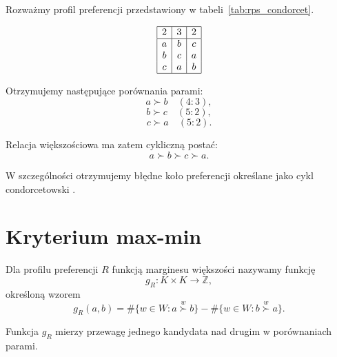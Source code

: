 \documentclass[12pt,a4paper]{mwrep}
\begin{document}
	\begin{example}
		Rozważmy profil preferencji przedstawiony w tabeli~\ref{tab:rps_condorcet}.
		
		\begin{table}[H]
			\centering
			\[
			\begin{array}{|c|c|c|}
				\hline
				2 & 3 & 2\\
				\hline
				a & b & c\\
				b & c & a\\
				c & a & b\\
				\hline
			\end{array}
			\]
			\caption{Profil preferencji typu kamień–papier–nożyce}
			\label{tab:rps_condorcet}
		\end{table}
		
		Otrzymujemy następujące porównania parami:
		\[
		a \succ b \quad (4:3),
		\]
		\[
		b \succ c \quad (5:2),
		\]
		\[
		c \succ a \quad (5:2).
		\]
		
		Relacja większościowa ma zatem cykliczną postać:
		\[
		a \succ b \succ c \succ a.
		\]
		
		W szczególności otrzymujemy błędne koło preferencji określane jako cykl condorcetowski \cite{rzazewski2014}.
	\end{example}

	\section{Kryterium max-min}
	
	\begin{definition}
		\label{def:magines-wiekszosci}
		Dla profilu preferencji \(R\) funkcją marginesu większości nazywamy funkcję
		\[
		g_R : K \times K \to \mathbb{Z},
		\]
		określoną wzorem
		\[
		g_R(a,b) =
		\#\{w \in W : a \overset{w}{\succ} b\}
		-
		\#\{w \in W : b \overset{w}{\succ} a\}.
		\]
	\end{definition}

	Funkcja \(g_R\) mierzy przewagę jednego kandydata nad drugim w porównaniach parami.
	
\end{document}
